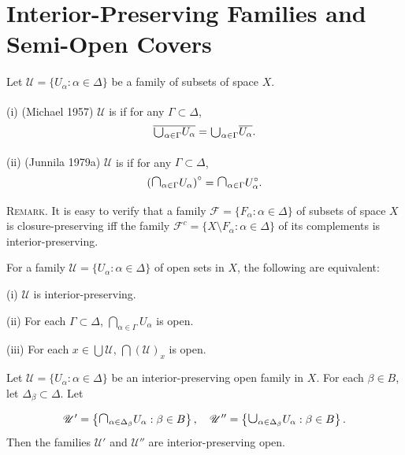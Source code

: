 \documentclass[prelim.tex]{subfiles}
\begin{document}
\section{Interior-Preserving Families and Semi-Open Covers}  
\label{sec:1.3}

{\label{def:1.3.1}
Let $\mathscr{U} = \{U_{\alpha}: \alpha \in\Delta\}$ be a family of subsets of space $X$.

\textup{(i) (\hstretch{1.8}{[}Michael 1957\hstretch{1.8}{]}\textsuperscript{\cite{Michael1957}})}
$\mathscr{U}$ is 
if for any $\Gamma \subset \Delta$,
$$\overline{ \raisebox{-2pt}{\scalebox{1.5}{$\cup$}}_{\alpha\in \Gamma} U_{\alpha}} 
=  \raisebox{-2pt}{\scalebox{1.5}{$\cup$}}_{\alpha\in \Gamma} \overline{U_{\alpha}}.$$

\textup{(ii) (\hstretch{1.8}{[}Junnila 1979a\hstretch{1.8}{]}\textsuperscript{\cite{Junnila1979a}})} 
$\mathscr{U}$ is 
 if for any $\Gamma \subset \Delta$,
$$\left(\scalebox{1.4}{$\cap$}_{\alpha\in \Gamma} U_{\alpha}\right)^{\circ} 
= \scalebox{1.4}{$\cap$}_{\alpha\in \Gamma} U_{\alpha}^{\circ}.$$
} %

\noindent\textsc{Remark}. It is easy to verify that a  family $\mathscr{F} = \{F_\alpha: \alpha \in \Delta\}$
of subsets of space $X$ is closure-preserving iff the family $\mathscr{F}^c = 
\{X \setminus F_\alpha: \alpha \in \Delta\}$ of its complements is interior-preserving. 

{\lemma{}  \label{lem:1.3.2}
For a family $\mathscr{U} = \{U_\alpha: \alpha \in \Delta\}$ of open sets in $X$, the following are equivalent:

\textup{(i)} $\mathscr{U}$ is interior-preserving.
	
\textup{(ii)} For each  $\Gamma \subset \Delta$, $\bigcap_{\alpha \in \Gamma} U_\alpha$ is open.
	
\textup{(iii)}  For each $x \in \bigcup\mathscr{U}$, $\bigcap(\mathscr{U})_x$ is open.
\hfill \qedsymbol
} %

{\theorem{} \label{th:1.3.3}
Let $\mathscr{U} = \{U_\alpha: \alpha \in \Delta\}$ be an interior-preserving
 open family in $X$. For each $\beta \in B$, let $\Delta_\beta \subset \Delta$. Let

$$\mathscr{U}' = \left\{ \scalebox{1.4}{$\cap$}_{\alpha \in \Delta_\beta} U_\alpha: 
\beta \in B \right\}, \quad \mathscr{U}'' = 
\left\{ \scalebox{1.4}{$\cup$}_{\alpha \in \Delta_\beta} U_\alpha: \beta \in B \right\}.$$
Then the families $\mathscr{U}'$ and $\mathscr{U}''$ are interior-preserving open.
} %
\end{document}
